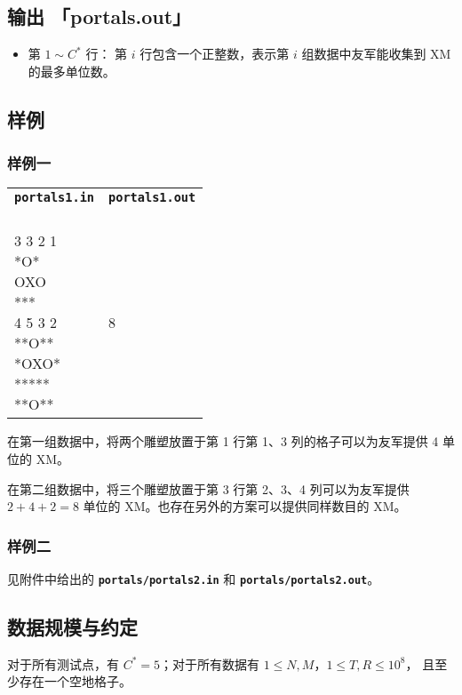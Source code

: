\documentclass[UTF8, 11pt, a4paper]{article}
\begin{document}
\subsection*{输出 \makebox[0.5em]{} \small{「portals.out」}}
\begin{itemize}
    \item 第 $1 \sim C^*$ 行：%
        第 $i$ 行包含一个正整数，表示第 $i$ 组数据中友军能收集到 XM 的最多单位数。
\end{itemize}
\newpage

\subsection*{样例}
\subsubsection*{样例一}
\begin{table}[h]\centering
\begin{tabularx}{0.8 \textwidth}{|X|X|}
\hline
\texttt{\textbf{portals1.in}} & \texttt{\textbf{portals1.out}} \\ \hline
{\ttfamily
2\newline
3 3 2 1\newline
*O*\newline
OXO\newline
***\newline
4 5 3 2\newline
**O**\newline
*OXO*\newline
*****\newline
**O**
} & {\ttfamily
4\newline
8
}
\\ \hline
\end{tabularx}\end{table}

在第一组数据中，将两个雕塑放置于第 1 行第 1、3 列的格子可以为友军提供 4 单位的 XM。

在第二组数据中，将三个雕塑放置于第 3 行第 2、3、4 列可以为友军提供 %
$2 + 4 + 2 = 8$ 单位的 XM。也存在另外的方案可以提供同样数目的 XM。

\subsubsection*{样例二}
见附件中给出的 \texttt{\textbf{portals/portals2.in}} 和 \texttt{\textbf{portals/portals2.out}}。

\subsection*{数据规模与约定}
对于所有测试点，有 $C^* = 5$；对于所有数据有 $1 \leq N, M$，$1 \leq T, R \leq 10^8$，%
且至少存在一个空地格子。
\end{document}
